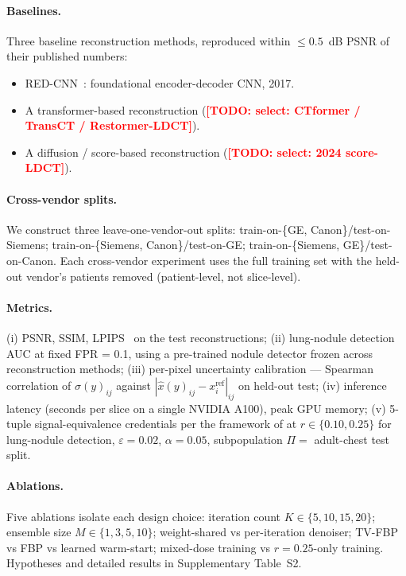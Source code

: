 \documentclass{article}  %
\newcommand{\todo}[1]{\textcolor{red}{\textbf{[TODO: #1]}}}
\begin{document}
\paragraph{Baselines.} Three baseline reconstruction methods, reproduced within $\leq 0.5$~dB PSNR of their published numbers:
\begin{itemize}
    \item RED-CNN~\citep{chen2017redcnn}: foundational encoder-decoder CNN, 2017.
    \item A transformer-based reconstruction (\todo{select: CTformer / TransCT / Restormer-LDCT}).
    \item A diffusion / score-based reconstruction (\todo{select: 2024 score-LDCT}).
\end{itemize}

\paragraph{Cross-vendor splits.} We construct three leave-one-vendor-out splits: train-on-\{GE, Canon\}/test-on-Siemens; train-on-\{Siemens, Canon\}/test-on-GE; train-on-\{Siemens, GE\}/test-on-Canon. Each cross-vendor experiment uses the full training set with the held-out vendor's patients removed (patient-level, not slice-level).

\paragraph{Metrics.} (i) PSNR, SSIM, LPIPS~\citep{zhang2018lpips} on the test reconstructions; (ii) lung-nodule detection AUC at fixed FPR = 0.1, using a pre-trained nodule detector frozen across reconstruction methods; (iii) per-pixel uncertainty calibration --- Spearman correlation of $\sigma(y)_{ij}$ against $|\hat{x}(y)_{ij} - x_i^{\textrm{ref}}|_{ij}$ on held-out test; (iv) inference latency (seconds per slice on a single NVIDIA A100), peak GPU memory; (v) 5-tuple signal-equivalence credentials per the framework of \citet{ws2framework} at $r \in \{0.10, 0.25\}$ for lung-nodule detection, $\varepsilon = 0.02$, $\alpha = 0.05$, subpopulation $\Pi = $ adult-chest test split.

\paragraph{Ablations.} Five ablations isolate each design choice: iteration count $K \in \{5, 10, 15, 20\}$; ensemble size $M \in \{1, 3, 5, 10\}$; weight-shared vs per-iteration denoiser; TV-FBP vs FBP vs learned warm-start; mixed-dose training vs $r = 0.25$-only training. Hypotheses and detailed results in Supplementary Table~S2.
\end{document}
